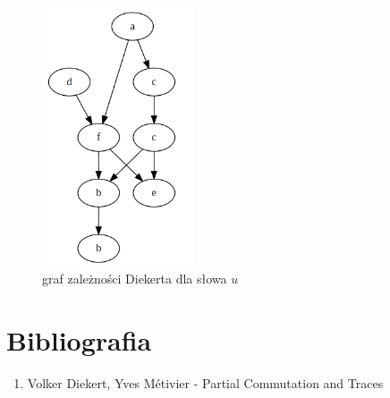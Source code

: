 \documentclass{article}
\begin{document}
\begin{figure}[H]
    \centering
    \includegraphics[width=0.4\textwidth]{graph_2.png}
    \caption{graf zależności Diekerta dla słowa $u$}
\end{figure}

\section{Bibliografia}

\begin{enumerate}
    \item
    Volker Diekert, Yves Métivier - Partial Commutation and Traces
\end{enumerate}
\end{document}
